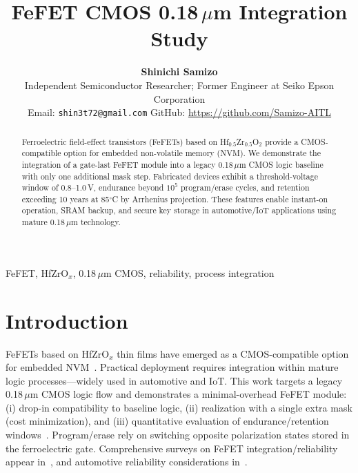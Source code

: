 \documentclass[journal]{IEEEtran}
\begin{document}
\title{FeFET CMOS 0.18\,$\mu$m Integration Study}

\author{%
  \textbf{Shinichi Samizo}\\[-1mm]
  \small Independent Semiconductor Researcher; Former Engineer at Seiko Epson Corporation\\
  \small Email: \texttt{shin3t72@gmail.com}\quad
  GitHub: \url{https://github.com/Samizo-AITL}
}
\maketitle

\begin{abstract}
Ferroelectric field-effect transistors (FeFETs) based on Hf$_{0.5}$Zr$_{0.5}$O$_2$ provide a CMOS-compatible option for embedded non-volatile memory (NVM). We demonstrate the integration of a gate-last FeFET module into a legacy 0.18\,$\mu$m CMOS logic baseline with only one additional mask step. Fabricated devices exhibit a threshold-voltage window of 0.8--1.0\,V, endurance beyond $10^5$ program/erase cycles, and retention exceeding 10 years at 85$^\circ$C by Arrhenius projection. These features enable instant-on operation, SRAM backup, and secure key storage in automotive/IoT applications using mature 0.18\,$\mu$m technology.
\end{abstract}

\begin{IEEEkeywords}
FeFET, HfZrO$_x$, 0.18\,$\mu$m CMOS, reliability, process integration
\end{IEEEkeywords}

\FloatBarrier %

\section{Introduction}
FeFETs based on HfZrO$_x$ thin films have emerged as a CMOS-compatible option for embedded NVM~\cite{boscke2011,muller2012,schenk2019}. Practical deployment requires integration within mature logic processes---widely used in automotive and IoT. This work targets a legacy 0.18\,$\mu$m CMOS logic flow and demonstrates a minimal-overhead FeFET module:
(i) drop-in compatibility to baseline logic,
(ii) realization with a single extra mask (cost minimization), and
(iii) quantitative evaluation of endurance/retention windows~\cite{mueller2015,park2020}.
Program/erase rely on switching opposite polarization states stored in the ferroelectric gate.
Comprehensive surveys on FeFET integration/reliability appear in~\cite{khan2015,polakowski2014}, and automotive reliability considerations in~\cite{nakamura2003}.
\end{document}

